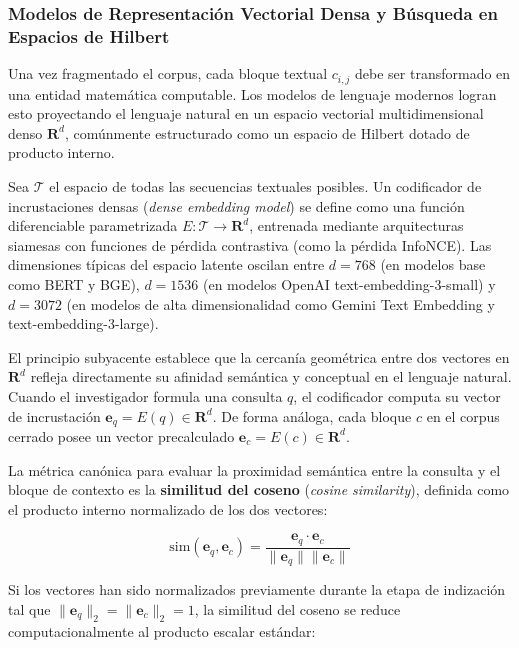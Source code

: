 \subsubsection{Modelos de Representación Vectorial Densa y Búsqueda en Espacios de Hilbert}

Una vez fragmentado el corpus, cada bloque textual $c_{i,j}$ debe ser transformado en una entidad matemática computable. Los modelos de lenguaje modernos logran esto proyectando el lenguaje natural en un espacio vectorial multidimensional denso $\mathbf{R}^d$, comúnmente estructurado como un espacio de Hilbert dotado de producto interno.

Sea $\mathcal{T}$ el espacio de todas las secuencias textuales posibles. Un codificador de incrustaciones densas (\textit{dense embedding model}) se define como una función diferenciable parametrizada $E: \mathcal{T} \to \mathbf{R}^d$, entrenada mediante arquitecturas siamesas con funciones de pérdida contrastiva (como la pérdida InfoNCE). Las dimensiones típicas del espacio latente oscilan entre $d = 768$ (en modelos base como BERT y BGE), $d = 1536$ (en modelos OpenAI text-embedding-3-small) y $d = 3072$ (en modelos de alta dimensionalidad como Gemini Text Embedding y text-embedding-3-large).

El principio subyacente establece que la cercanía geométrica entre dos vectores en $\mathbf{R}^d$ refleja directamente su afinidad semántica y conceptual en el lenguaje natural. Cuando el investigador formula una consulta $q$, el codificador computa su vector de incrustación $\mathbf{e}_q = E(q) \in \mathbf{R}^d$. De forma análoga, cada bloque $c$ en el corpus cerrado posee un vector precalculado $\mathbf{e}_c = E(c) \in \mathbf{R}^d$.

La métrica canónica para evaluar la proximidad semántica entre la consulta y el bloque de contexto es la \textbf{similitud del coseno} (\textit{cosine similarity}), definida como el producto interno normalizado de los dos vectores:

\begin{equation}
\mathrm{sim}(\mathbf{e}_q, \mathbf{e}_c) = \frac{\mathbf{e}_q \cdot \mathbf{e}_c}{\|\mathbf{e}_q\| \|\mathbf{e}_c\|}
\label{eq:similitud_coseno}
\end{equation}

Si los vectores han sido normalizados previamente durante la etapa de indización tal que $\|\mathbf{e}_q\|_2 = \|\mathbf{e}_c\|_2 = 1$, la similitud del coseno se reduce computacionalmente al producto escalar estándar:

